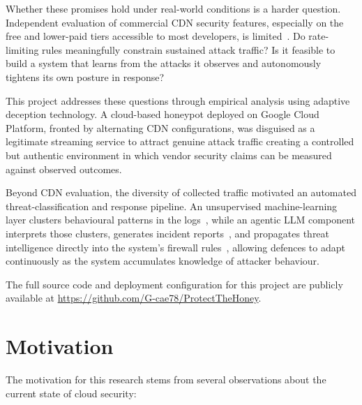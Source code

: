 \documentclass[12pt, a4paper]{report}   %
\begin{document}
Whether these promises hold under real-world conditions is a harder question.
Independent evaluation of commercial CDN security features, especially on the
free and lower-paid tiers accessible to most developers, is limited~\cite{cloudflare-wp}. 
Do rate-limiting rules meaningfully constrain sustained attack traffic? Is it
feasible to build a system that learns from the attacks it observes and
autonomously tightens its own posture in response?

This project addresses these questions through empirical analysis using adaptive
deception technology. A cloud-based honeypot deployed on Google Cloud Platform,
fronted by alternating CDN configurations, was disguised as a legitimate
streaming service to attract genuine attack traffic creating a controlled but
authentic environment in which vendor security claims can be measured against
observed outcomes.

Beyond CDN evaluation, the diversity of collected traffic motivated an automated
threat-classification and response pipeline. An unsupervised machine-learning
layer clusters behavioural patterns in the logs~\cite{sklearn-hdbscan}, while 
an agentic LLM component interprets those clusters, generates incident 
reports~\cite{jira-api}, and propagates threat intelligence directly into the 
system's firewall rules~\cite{cf-api-lockdown}, allowing defences to adapt 
continuously as the system accumulates knowledge of attacker behaviour.

The full source code and deployment configuration for this project are publicly
available at \url{https://github.com/G-cae78/ProtectTheHoney}.

\section{Motivation}

The motivation for this research stems from several observations about the current
state of cloud security:
\end{document}
